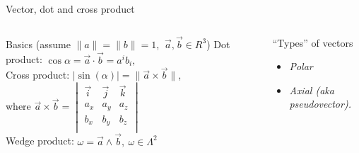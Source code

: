 \documentclass[10pt]{beamer}
\newcommand*{\vectpr}[2]{ \vec{#1} \times \vec{#2} }
\newcommand*{\dotpr}[2]{ \vec{#1} \cdot \vec{#2} }
\newcommand*{\vind}[2]{ {#1}_{#2} }
\begin{document}
\begin{frame}[t]{Vector, dot and cross product}
\begin{columns}[t,onlytextwidth]
    \begin{block}{Basics (assume $\|a\|=\|b\|=1$, $\ \vec{a}, \vec{b} \in R^3 $)}     
      Dot product: $\cos{\alpha} = \dotpr{a}{b} = a^{i} b_i, $ \\
      Cross product:  $|\sin(\alpha)| = \|\vectpr{a}{b}\|$, \\
      where $\vectpr{a}{b} = \begin{vmatrix}
			\vec{i} & \vec{j} & \vec{k} \\
			\vind{a}{x} & \vind{a}{y} & \vind{a}{z} \\
			\vind{b}{x} & \vind{b}{y} & \vind{b}{z} \\
		      \end{vmatrix}
      $ \\
      Wedge product: $\omega = \vec{a} \wedge \vec{b}, \ \omega \in \Lambda^2$
    \end{block}   
    
    \begin{exampleblock}{``Types'' of vectors}
     \begin{itemize}
      \item \textit{Polar}
      \item \textit{Axial (aka pseudovector). }
     \end{itemize}
    \end{exampleblock}   
\end{columns}

\end{frame}
\end{document}
